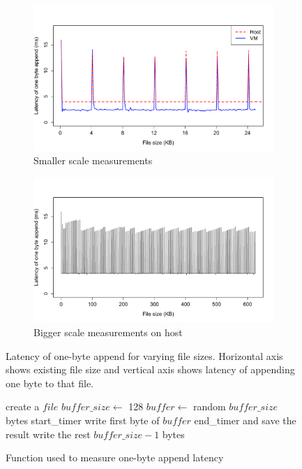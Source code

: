 \begin{figure}[ht!]
    \begin{subfigure}[b]{0.5\textwidth}
		\includegraphics[width=1\textwidth]{./figures/p4_small.pdf}
		\caption{Smaller scale measurements}
		\label{fig:p4smallgraph}
    \end{subfigure}
    \begin{subfigure}[b]{0.5\textwidth}
		\includegraphics[width=1\textwidth]{./figures/p4_big.pdf}
		\caption{Bigger scale measurements on host}
		\label{fig:p4biggraph}
    \end{subfigure}
	\caption{Latency of one-byte append for varying file sizes. Horizontal axis shows existing file size and vertical axis shows latency of appending one byte to that file.}
	\label{fig:p4}
\end{figure}

\begin{figure}
\begin{algorithmic}
\STATE create a $file$
\STATE $buffer\_size \leftarrow$ 128
\STATE $buffer \leftarrow$ random $buffer\_size$ bytes
\STATE start\_timer
\STATE write first byte of $buffer$
\STATE end\_timer and save the result
\STATE write the rest $buffer\_size - 1$ bytes
\ENDFOR
\end{algorithmic}
\caption{Function used to measure one-byte append latency}
\label{fig:p4pseudo}
\end{figure}

